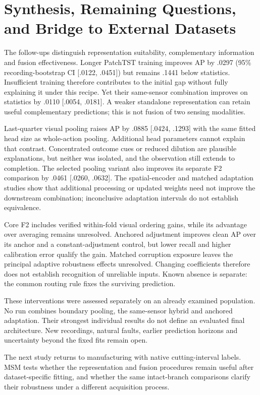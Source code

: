 \section{Synthesis, Remaining Questions, and Bridge to External Datasets}
The follow-ups distinguish representation suitability, complementary information and
fusion effectiveness. Longer PatchTST training improves AP by .0297 (95\%
recording-bootstrap CI [.0122, .0451]) but remains .1441 below statistics. Insufficient
training therefore contributes to the initial gap without fully explaining it under this
recipe. Yet their same-sensor combination improves on statistics by .0110 [.0054,
.0181]. A weaker standalone representation can retain useful complementary predictions;
this is not fusion of two sensing modalities.

Last-quarter visual pooling raises AP by .0885 [.0424, .1293] with the same fitted head
size as whole-action pooling. Additional head parameters cannot explain that contrast.
Concentrated outcome cues or reduced dilution are plausible explanations, but neither
was isolated, and the observation still extends to completion. The selected pooling
variant also improves its separate F2 comparison by .0461 [.0260, .0632]. The
spatial-encoder and matched adaptation studies show that additional processing or
updated weights need not improve the downstream combination; inconclusive adaptation
intervals do not establish equivalence.

Core F2 includes verified within-fold visual ordering gains, while its advantage over
averaging remains unresolved. Anchored adjustment improves clean AP over its anchor and
a constant-adjustment control, but lower recall and higher calibration error qualify the
gain. Matched corruption exposure leaves the principal adaptive robustness effects
unresolved. Changing coefficients therefore does not establish recognition of unreliable
inputs. Known absence is separate: the common routing rule fixes the surviving
prediction.

These interventions were assessed separately on an already examined population. No run
combines boundary pooling, the same-sensor hybrid and anchored adaptation. Their
strongest individual results do not define an evaluated final architecture. New
recordings, natural faults, earlier prediction horizons and uncertainty beyond the fixed
fits remain open.

The next study returns to manufacturing with native cutting-interval labels. MSM tests
whether the representation and fusion procedures remain useful after dataset-specific
fitting, and whether the same intact-branch comparisons clarify their robustness under
a different acquisition process.
